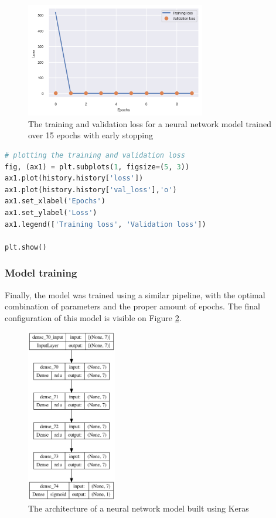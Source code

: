 \documentclass{article}
\begin{document}
\begin{figure}
\centering
\includegraphics[width=0.7\textwidth]{loss_vs_epochs.png}
\caption{\label{fig:loss_vs_epochs}The training and validation loss for a neural network model trained over 15 epochs with early stopping}
\end{figure}

\begin{lstlisting}[language=Python]
# plotting the training and validation loss
fig, (ax1) = plt.subplots(1, figsize=(5, 3))
ax1.plot(history.history['loss'])
ax1.plot(history.history['val_loss'],'o')
ax1.set_xlabel('Epochs')
ax1.set_ylabel('Loss')
ax1.legend(['Training loss', 'Validation loss'])

plt.show()
\end{lstlisting}

\subsubsection{Model training}

Finally, the model was trained using a similar pipeline, with the optimal combination of parameters and the proper amount of epochs. The final configuration of this model is visible on Figure \ref{fig:nn_plot}.

\begin{figure}
\centering
\includegraphics[width=0.35\textwidth]{nn_plot.png}
\caption{\label{fig:nn_plot}The architecture of a neural network model built using Keras}
\end{figure}
\end{document}
